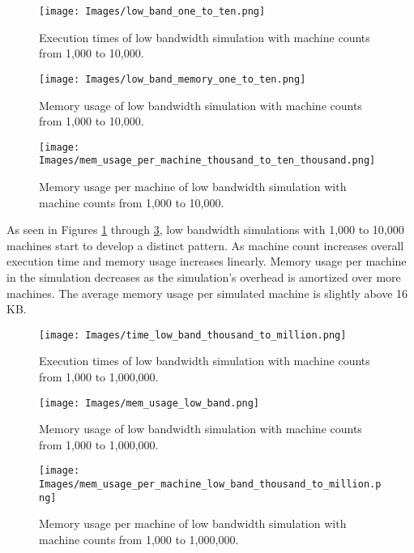 \documentclass[journal]{IEEEtran} %
\newcommand{\imagewidth}{0.45\textwidth}
\begin{document}
\begin{figure}[H]
    \centerline{\texttt{[image: Images/low\_band\_one\_to\_ten.png]}}
    \caption{Execution times of low bandwidth simulation with machine counts from 1,000 to 10,000.}
    \label{fig:low_band_one_to_ten}
\end{figure}

\begin{figure}[H]
    \centerline{\texttt{[image: Images/low\_band\_memory\_one\_to\_ten.png]}}
    \caption{Memory usage of low bandwidth simulation with machine counts from 1,000 to 10,000.}
    \label{fig:low_band_memory_one_to_ten}
\end{figure}

\begin{figure}[H]
    \centerline{\texttt{[image: Images/mem\_usage\_per\_machine\_thousand\_to\_ten\_thousand.png]}}
    \caption{Memory usage per machine of low bandwidth simulation with machine counts from 1,000 to 10,000.}
    \label{fig:low_band_memory_per_machine_one_to_ten}
\end{figure}

As seen in Figures \ref{fig:low_band_one_to_ten} through \ref{fig:low_band_memory_per_machine_one_to_ten}, low bandwidth simulations with 1,000 to 10,000 machines start to develop a distinct pattern. As machine count increases overall execution time and memory usage increases linearly. Memory usage per machine in the simulation decreases as the simulation's overhead is amortized over more machines. The average memory usage per simulated machine is slightly above 16 KB.

\begin{figure}[H]
    \centerline{\texttt{[image: Images/time\_low\_band\_thousand\_to\_million.png]}}
    \caption{Execution times of low bandwidth simulation with machine counts from 1,000 to 1,000,000.}
    \label{fig:low_band_one_to_million}
\end{figure}

\begin{figure}[H]
    \centerline{\texttt{[image: Images/mem\_usage\_low\_band.png]}}
    \caption{Memory usage of low bandwidth simulation with machine counts from 1,000 to 1,000,000.}
    \label{fig:low_band_memory_one_to_million}
\end{figure}

\begin{figure}[H]
    \centerline{\texttt{[image: Images/mem\_usage\_per\_machine\_low\_band\_thousand\_to\_million.png]}}
    \caption{Memory usage per machine of low bandwidth simulation with machine counts from 1,000 to 1,000,000.}
    \label{fig:low_band_memory_per_machine_one_to_million}
\end{figure}
\end{document}

